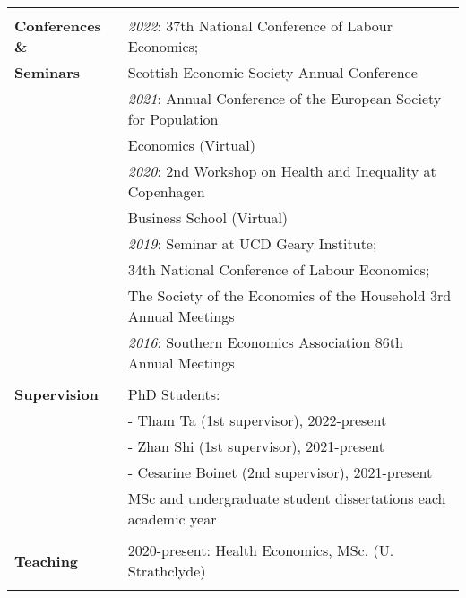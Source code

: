 \documentclass[11pt,a4paper]{article}
\begin{document}
\begin{longtable}{l l}
{                                                        &   \\
\textbf{Conferences \&}             &  \textit{2022}: 37th National Conference of Labour Economics;    \\ 
\textbf{Seminars}													&  \quad \quad  \;\; Scottish Economic Society Annual Conference  \\
\addlinespace
																												&  \textit{2021}: Annual Conference of the European Society for Population  \\ 
																												&  \quad \quad  \;\; Economics (Virtual)  \\
\addlinespace
																												&  \textit{2020}: 2nd Workshop on Health and Inequality at Copenhagen   \\
																												&  \quad \quad  \;\; Business School (Virtual)  \\
\addlinespace
																												&  \textit{2019}: Seminar at UCD Geary Institute;   \\
																												&  \quad \quad  \;\; 34th National Conference of Labour Economics;   \\
																												&  \quad \quad  \;\; The Society of the Economics of the Household 3rd Annual Meetings  \\
\addlinespace																												
																												& \textit{2016}: Southern Economics Association 86th Annual Meetings  \\				
																												&  \\
\textbf{Supervision}											&  PhD Students:  \\
																												&  \hspace{0.05cm} - Tham Ta (1st supervisor), 2022-present \\
																												&  \hspace{0.05cm} - Zhan Shi (1st supervisor), 2021-present  \\
																												&  \hspace{0.05cm} - Cesarine Boinet (2nd supervisor), 2021-present  \\
\addlinespace																												
																												& MSc and undergraduate student dissertations each academic year  \\			
																												&  \\
\textbf{Teaching}													&  2020-present: Health Economics, MSc. (U. Strathclyde)  \\  															
}
\end{longtable}
\end{document}

